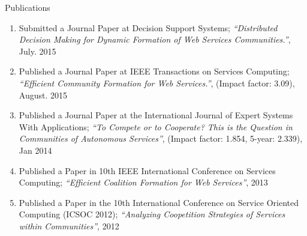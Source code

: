\documentclass{beamer}
\begin{document}
\begin{frame}{Publications}
    \scriptsize
    \begin{enumerate}
        \item Submitted a Journal Paper at {\color{blue}Decision Support Systems;} \emph{``Distributed Decision Making for Dynamic Formation of Web Services Communities.''}, July. 2015
        \item Published a Journal Paper at {\color{blue}IEEE Transactions on Services Computing;} \emph{``Efficient Community Formation for Web Services.''}, (Impact factor: 3.09), August. 2015
        \item Published a Journal Paper at the {\color{blue}International Journal of Expert Systems With Applications;} \emph{``To Compete or to Cooperate? This is the Question in Communities of Autonomous Services''},  (Impact factor: 1.854, 5-year: 2.339), Jan 2014
        \item Published a Paper in {\color{blue}10th IEEE International Conference on Services Computing;} \emph{``Efficient Coalition Formation for Web Services''}, 2013
        \item Published a Paper in the {\color{blue}10th International Conference on Service Oriented Computing (ICSOC 2012);} \emph{``Analyzing Coopetition Strategies of Services within Communities''}, 2012
    \end{enumerate}
\end{frame}

%
\end{document}
